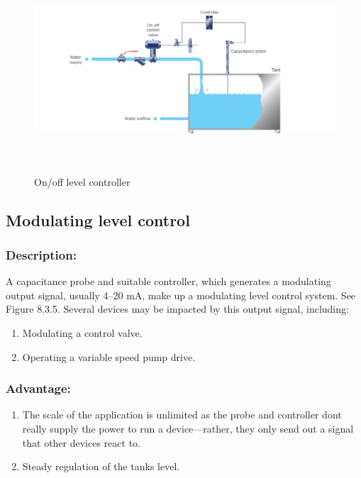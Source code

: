 \begin{figure}[h!]
  \centering
  \includegraphics[width=6.75312in,height=3in]{figs/control_instrumentation/image5.png}
  \caption{On/off level controller}
  \label{fig:On/off level controller}
\end{figure}


\subsection{Modulating level control}

\subsubsection{Description:}

A capacitance probe and suitable controller, which generates a
modulating output signal, usually 4--20 mA, make up a modulating level
control system. See Figure 8.3.5. Several devices may be impacted by
this output signal, including:

\begin{enumerate}
\item
  Modulating a control valve.
\item
  Operating a variable speed pump drive.
\end{enumerate}

\subsubsection{Advantage:}

\begin{enumerate}
\item
  The scale of the application is unlimited as the probe and controller
  don\textquotesingle t really supply the power to run a
  device---rather, they only send out a signal that other devices react
  to.
\item
  Steady regulation of the tank\textquotesingle s level.
\end{enumerate}

